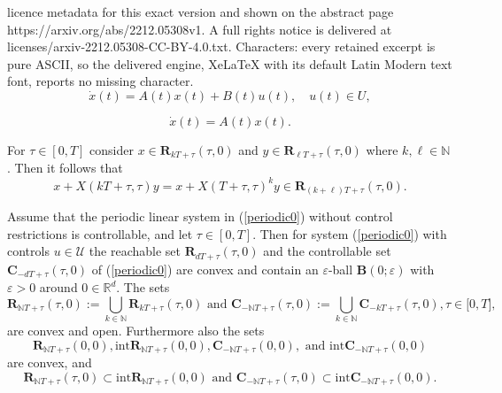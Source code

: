 \documentclass[10pt,a4paper]{amsart}
\begin{document}
licence metadata for this exact version and shown on the abstract page https://arxiv.org/abs/2212.05308v1. A full rights notice is delivered at licenses/arxiv-2212.05308-CC-BY-4.0.txt. Characters: every retained excerpt is pure ASCII, so the delivered engine, XeLaTeX with its default Latin Modern text font, reports no missing character.
\begin{equation}
\dot{x}(t)=A(t)x(t)+B(t)u(t),\quad u(t)\in U, \label{periodic0}%
\end{equation}

\begin{equation}
\dot{x}(t)=A(t)x(t). \label{hom}%
\end{equation}

\begin{proposition}
\label{Proposition9_JDDE}For $\tau\in\left[  0,T\right]  $ consider
$x\in\mathbf{R}_{kT+\tau}(\tau,0)$ and $y\in\mathbf{R}_{\ell T+\tau}(\tau,0)$
where $k,\ell\in\mathbb{N}$. Then it follows that%
\begin{equation}
x+X(kT+\tau,\tau)y=x+X(T+\tau,\tau)^{k}y\in\mathbf{R}_{(k+\ell)T+\tau}%
(\tau,0). \label{2.6}%
\end{equation}

\end{proposition}

\begin{proposition}
\label{proposition_R}Assume that the periodic linear system in
(\ref{periodic0}) without control restrictions is controllable, and let
$\tau\in\left[  0,T\right]  $. Then for system (\ref{periodic0}) with controls
$u\in\mathcal{U}$ the reachable set $\mathbf{R}_{dT+\tau}(\tau,0)$ and the
controllable set $\mathbf{C}_{-dT+\tau}(\tau,0)$ of (\ref{periodic0}) are
convex and contain an $\varepsilon$-ball $\mathbf{B}(0;\varepsilon)$ with
$\varepsilon>0$ around $0\in\mathbb{R}^{d}$. The sets%
\[
\mathbf{R}_{\mathbb{N}T+\tau}(\tau,0):=\bigcup_{k\in\mathbb{N}}\mathbf{R}%
_{kT+\tau}(\tau,0)\text{ and }\mathbf{C}_{-\mathbb{N}T+\tau}(\tau
,0):=\bigcup_{k\in\mathbb{N}}\mathbf{C}_{-kT+\tau}(\tau,0),\tau\in
\lbrack0,T],
\]
are convex and open. Furthermore also the sets%
\[
\mathbf{R}_{\mathbb{N}T+\tau}(0,0),\mathrm{int}\mathbf{R}_{\mathbb{N}T+\tau
}(0,0),\mathbf{C}_{-\mathbb{N}T+\tau}(0,0),\text{ and }\mathrm{int}%
\mathbf{C}_{-\mathbb{N}T+\tau}(0,0)
\]
are convex, and%
\[
\mathbf{R}_{\mathbb{N}T+\tau}(\tau,0)\subset\mathrm{int}\mathbf{R}%
_{\mathbb{N}T+\tau}(0,0)\text{ and }\mathbf{C}_{-\mathbb{N}T+\tau}%
(\tau,0)\subset\mathrm{int}\mathbf{C}_{-\mathbb{N}T+\tau}(0,0).
\]

\end{proposition}
\end{document}
